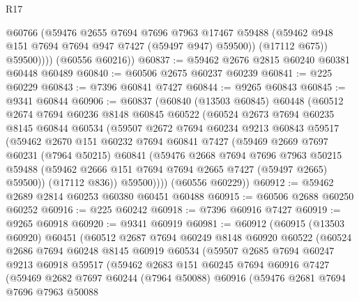 \begin{lexlean}{R17}
\begin{coremodule}
                @60766
                (@59476
                  @2655
                  @7694
                  @7696
                  @7963
                  @17467
                  @59488
                  (@59462 @948 @151 @7694 @7694 @947 @7427 (@59497 @947) @59500))
                (@17112 @675))
              @59500))))
      (@60556 @60216))
@60837 := @59462 @2676 @2815 @60240 @60381 @60448 @60489
@60840 := @60506 @2675 @60237 @60239
@60841 := @225 @60229
@60843 := @7396 @60841 @7427
@60844 := @9265 @60843
@60845 := @9341 @60844
@60906 := @60837
    (@60840
      (@13503 @60845)
      @60448
      (@60512
        @2674
        @7694
        @60236
        @8148
        @60845
        @60522
        (@60524
          @2673
          @7694
          @60235
          @8145
          @60844
          @60534
          (@59507
            @2672
            @7694
            @60234
            @9213
            @60843
            @59517
            (@59462
              @2670
              @151
              @60232
              @7694
              @60841
              @7427
              (@59469
                @2669
                @7697
                @60231
                (@7964 @50215)
                @60841
                (@59476
                  @2668
                  @7694
                  @7696
                  @7963
                  @50215
                  @59488
                  (@59462 @2666 @151 @7694 @7694 @2665 @7427 (@59497 @2665) @59500))
                (@17112 @836))
              @59500))))
      (@60556 @60229))
@60912 := @59462 @2689 @2814 @60253 @60380 @60451 @60488
@60915 := @60506 @2688 @60250 @60252
@60916 := @225 @60242
@60918 := @7396 @60916 @7427
@60919 := @9265 @60918
@60920 := @9341 @60919
@60981 := @60912
    (@60915
      (@13503 @60920)
      @60451
      (@60512
        @2687
        @7694
        @60249
        @8148
        @60920
        @60522
        (@60524
          @2686
          @7694
          @60248
          @8145
          @60919
          @60534
          (@59507
            @2685
            @7694
            @60247
            @9213
            @60918
            @59517
            (@59462
              @2683
              @151
              @60245
              @7694
              @60916
              @7427
              (@59469
                @2682
                @7697
                @60244
                (@7964 @50088)
                @60916
                (@59476
                  @2681
                  @7694
                  @7696
                  @7963
                  @50088

\end{coremodule}
\end{lexlean}
